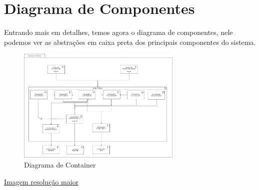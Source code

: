   \section{Diagrama de Componentes}
  Entrando mais em detalhes, temos agora o diagrama de componentes, nele podemos ver as abstrações em caixa preta dos principais componentes
  do sistema.
  
  \begin{figure}[h]
    \centering
    \includegraphics[width=0.7\textwidth]{diagrama_componentes.png}
    \caption{Diagrama de Container}
    \label{fig:Diagrama de Componentes}
  \end{figure}

  \href{https://github.com/soltein/TCC/blob/main/Diagramas/diagrama_componentes.png}{Imagem resolução maior}